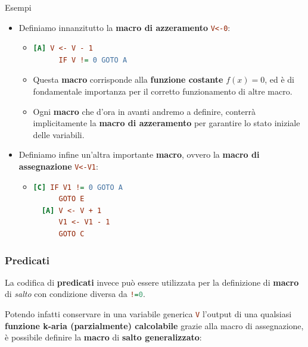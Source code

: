 \begin{generalbox}[colframe=azure-gradient-3!90!black]{Esempi}
  \begin{itemize}
    \item Definiamo innanzitutto la \textbf{macro di azzeramento} \lstinline[language=ini]{V<-0}:
    \begin{itemize}
      \item []
  \begin{lstlisting}[language=ini, label={Aggiornamento},  caption=Macro di azzeramento]
  [A] V <- V - 1
      IF V != 0 GOTO A
  \end{lstlisting}
    \item [] Questa \textbf{macro} corrisponde alla \textbf{funzione costante} \(f(x)=0\), ed è di fondamentale importanza per il corretto funzionamento di altre macro.
    \item [] Ogni \textbf{macro} che d'ora in avanti andremo a definire, conterrà implicitamente la \textbf{macro di azzeramento} per garantire lo stato iniziale delle variabili.
    \end{itemize}
    \item Definiamo infine un'altra importante \textbf{macro}, ovvero la \textbf{macro di assegnazione} \lstinline[language=ini]{V<-V1}:
  \begin{itemize}
    \item []
  \begin{lstlisting}[language=ini, label={Assegnazione},  caption=Macro di assegnazione]
  [C] IF V1 != 0 GOTO A
      GOTO E
  [A] V <- V + 1
      V1 <- V1 - 1
      GOTO C
    \end{lstlisting}
  \end{itemize}
\end{itemize}
\end{generalbox}

\subsubsection{Predicati}

La codifica di \textbf{predicati} invece può essere utilizzata per la definizione di \textbf{macro} di \textit{salto} con condizione diversa da \lstinline[language=ini]{!=0}.

Potendo infatti conservare in una variabile generica \lstinline[language=ini]{V} l'output di una qualsiasi \textbf{funzione k-aria (parzialmente) calcolabile} grazie alla macro di assegnazione, è possibile definire la \textbf{macro} di
\textbf{salto generalizzato}:


